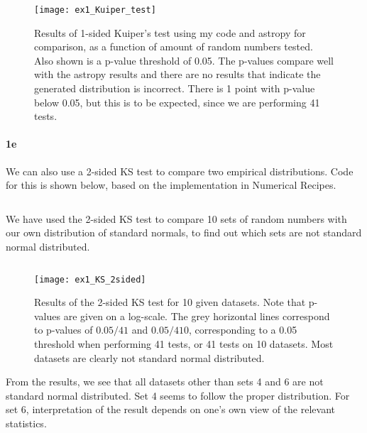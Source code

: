 \inputminted[firstline=105, lastline=135]{Python}{../NUR_random.py}
\inputminted[firstline=83, lastline=101]{Python}{../ex1.py}

\begin{figure}[ht]
  \centering
  \texttt{[image: ex1\_Kuiper\_test]}
  \caption{Results of 1-sided Kuiper's test using my code and astropy for comparison, as a function of amount of random numbers tested.
  Also shown is a p-value threshold of 0.05.
  The p-values compare well with the astropy results and there are no results that indicate the generated distribution is incorrect.
  There is 1 point with p-value below 0.05, but this is to be expected, since we are performing 41 tests.}\label{fig:ex1_Kuiper_test}
\end{figure}

\paragraph{1e}
We can also use a 2-sided KS test to compare two empirical distributions.
Code for this is shown below, based on the implementation in Numerical Recipes.

\inputminted[firstline=77, lastline=103]{Python}{../NUR_random.py}

We have used the 2-sided KS test to compare 10 sets of random numbers with our own distribution of standard normals, to find out which sets are not standard normal distributed.

\inputminted[firstline=103, lastline=121]{Python}{../ex1.py}

\begin{figure}[ht]
  \centering
  \texttt{[image: ex1\_KS\_2sided]}
  \caption{Results of the 2-sided KS test for 10 given datasets.
  Note that p-values are given on a log-scale.
  The grey horizontal lines correspond to p-values of $0.05/41$ and $0.05/410$, corresponding to a 0.05 threshold when performing 41 tests,
  or 41 tests on 10 datasets.
  Most datasets are clearly not standard normal distributed.}\label{fig:ex1_KS_2sided}
\end{figure}

From the results, we see that all datasets other than sets 4 and 6 are not standard normal distributed.
Set 4 seems to follow the proper distribution.
For set 6, interpretation of the result depends on one's own view of the relevant statistics.
\clearpage
